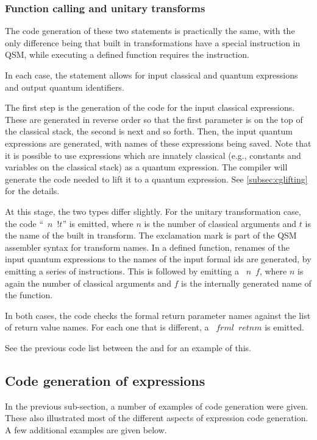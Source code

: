 \subsubsection{Function calling and unitary transforms}\label{subsubsec:cgfunctioncalls}
The code generation of these two statements is practically the same, with
the only difference being that built in transformations have a special
instruction in QSM, while executing a defined function requires
the  instruction.

In each case, the statement allows for input classical and quantum expressions
and output quantum identifiers.

The first step is the generation of the code for the input 
classical expressions. These are generated in reverse order so that the 
first parameter is on the top of the classical stack, the second is next
and so forth. Then, the input quantum expressions are generated,
with names of these expressions being saved. Note that it is possible to use
expressions which are innately classical (e.g., constants and variables on
the classical stack) as a quantum expression. The compiler will generate 
the code needed to lift it to a quantum expression. See 
\vref{subsec:cglifting} for the details.

At this stage, the two
types differ slightly. For the unitary transformation case, the
code ``~$n$~!$t$'' is emitted, where $n$ is the number of 
classical arguments and $t$ is the name of the built in transform. The
exclamation mark is part of the QSM assembler syntax for transform names.
In a defined function, renames of the input quantum expressions to
the names of the input formal ids are generated, 
by emitting a series of  
instructions. This is followed by emitting a ~$n$~$f$, 
where $n$ is again the number of classical arguments and $f$ is the 
internally generated name of the function.

In both cases, the code checks the formal return parameter names against
the list of return value names. For each one that is different, a 
~$frml$~$retnm$ is emitted.

See the previous code list between the   and
 for an example of this.



\subsection{Code generation of expressions}\label{subsec:cgexpression}
In the previous sub-section, a number of examples of code generation
were given. These also illustrated most of the different aspects of 
expression code generation. A few additional examples are given below.

